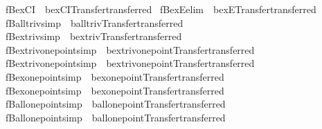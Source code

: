\begin{isabellebody}
\isamarkupfalse%
\ fBexCI\ {\isacharequal}\ bexCI{\isacharbrackleft}Transfer{\isachardot}transferred{\isacharbrackright}\isanewline
{}\isamarkupfalse%
\ fBexE{\isacharbrackleft}elim{\isacharbang}{\isacharbrackright}\ {\isacharequal}\ bexE{\isacharbrackleft}Transfer{\isachardot}transferred{\isacharbrackright}\isanewline
{}\isamarkupfalse%
\ fBall{\isacharunderscore}triv{\isacharbrackleft}simp{\isacharbrackright}\ {\isacharequal}\ ball{\isacharunderscore}triv{\isacharbrackleft}Transfer{\isachardot}transferred{\isacharbrackright}\isanewline
{}\isamarkupfalse%
\ fBex{\isacharunderscore}triv{\isacharbrackleft}simp{\isacharbrackright}\ {\isacharequal}\ bex{\isacharunderscore}triv{\isacharbrackleft}Transfer{\isachardot}transferred{\isacharbrackright}\isanewline
{}\isamarkupfalse%
\ fBex{\isacharunderscore}triv{\isacharunderscore}one{\isacharunderscore}point{}{\isacharbrackleft}simp{\isacharbrackright}\ {\isacharequal}\ bex{\isacharunderscore}triv{\isacharunderscore}one{\isacharunderscore}point{}{\isacharbrackleft}Transfer{\isachardot}transferred{\isacharbrackright}\isanewline
{}\isamarkupfalse%
\ fBex{\isacharunderscore}triv{\isacharunderscore}one{\isacharunderscore}point{}{\isacharbrackleft}simp{\isacharbrackright}\ {\isacharequal}\ bex{\isacharunderscore}triv{\isacharunderscore}one{\isacharunderscore}point{}{\isacharbrackleft}Transfer{\isachardot}transferred{\isacharbrackright}\isanewline
{}\isamarkupfalse%
\ fBex{\isacharunderscore}one{\isacharunderscore}point{}{\isacharbrackleft}simp{\isacharbrackright}\ {\isacharequal}\ bex{\isacharunderscore}one{\isacharunderscore}point{}{\isacharbrackleft}Transfer{\isachardot}transferred{\isacharbrackright}\isanewline
{}\isamarkupfalse%
\ fBex{\isacharunderscore}one{\isacharunderscore}point{}{\isacharbrackleft}simp{\isacharbrackright}\ {\isacharequal}\ bex{\isacharunderscore}one{\isacharunderscore}point{}{\isacharbrackleft}Transfer{\isachardot}transferred{\isacharbrackright}\isanewline
{}\isamarkupfalse%
\ fBall{\isacharunderscore}one{\isacharunderscore}point{}{\isacharbrackleft}simp{\isacharbrackright}\ {\isacharequal}\ ball{\isacharunderscore}one{\isacharunderscore}point{}{\isacharbrackleft}Transfer{\isachardot}transferred{\isacharbrackright}\isanewline
{}\isamarkupfalse%
\ fBall{\isacharunderscore}one{\isacharunderscore}point{}{\isacharbrackleft}simp{\isacharbrackright}\ {\isacharequal}\ ball{\isacharunderscore}one{\isacharunderscore}point{}{\isacharbrackleft}Transfer{\isachardot}transferred{\isacharbrackright}\isanewline

\end{isabellebody}
